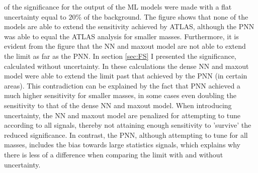 of the significance for the output of the \ac{ML} models were made with a flat uncertainty equal to $20\%$ of the background.
The figure shows that none of the models are able to extend the sensitivity achieved by \ac{ATLAS}, although the \ac{PNN} was able to equal
the \ac{ATLAS} analysis for smaller masses. Furthermore, it is evident from the figure that the \ac{NN} and maxout model are not able to 
extend the limit as far as the \ac{PNN}. In section \ref{sec:FS} I presented the significance, calculated without uncertainty. In these
calculations the dense \ac{NN} and maxout model were able to extend the limit past that achieved by the \ac{PNN} (in certain areas). 
This contradiction can be explained by the fact that \ac{PNN} achieved a much higher sensitivity for smaller masses, in some cases even 
doubling the sensitivity to that of the dense \ac{NN} and maxout model. When introducing uncertainty, the \ac{NN} and maxout model are 
penalized for attempting to tune according to all signals, thereby not attaining enough sensitivity to 'survive' the reduced significance. 
In contrast, the \ac{PNN}, although attempting to tune for all masses, includes the bias towards large statistics signals, which explains why there 
is less of a difference when comparing the limit with and without uncertainty.\\
